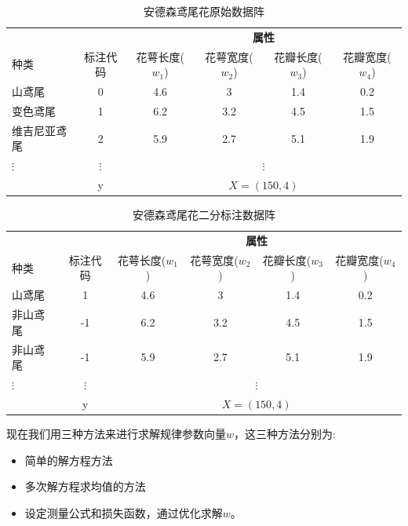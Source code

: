 \documentclass[12pt]{article}
\numberwithin{figure}{section}
\newenvironment{fullmodel}{
			\smallskip\noindent
			\begin{minipage}{\textwidth+\marginparwidth+\marginparsep}\smallskip\smallskip}
			{\smallskip\smallskip\end{minipage}\vspace{.1in}
			}
\numberwithin{equation}{section}
\begin{document}
\begin{fullmodel}
\begin{table}[H]
		\centering
		\renewcommand{\arraystretch}{1.2}
		\begin{tabular}{lccccc}
		\hline 
		\hline 
		& & \multicolumn{4}{c}{\textbf{属性}} \\
		\cline{3-6}
			种类 & 标注代码 & 花萼长度($w_1$) & 花萼宽度($w_2$) &花瓣长度($w_3$) & 花瓣宽度($w_4$) \\
			\hline 
			山鸢尾 & 0 & 4.6 &  3 &  1.4 & 0.2 \\
			变色鸢尾 & 1 & 6.2 &  3.2 & 4.5  & 1.5 \\
			维吉尼亚鸢尾 & 2 & 5.9 &  2.7 &  5.1 & 1.9  \\ 
			$\vdots$ & $\vdots$ & \multicolumn{4}{c}{$\vdots$} \\
			\hline 
			& y & \multicolumn{4}{c}{$X = (150, 4)$} \\
			\hline  
		\end{tabular}
		\caption{安德森鸢尾花原始数据阵}
\end{table}


\begin{table}[H]
		\centering
		\renewcommand{\arraystretch}{1.2}
		\begin{tabular}{lccccc}
		\hline 
		\hline 
		& & \multicolumn{4}{c}{\textbf{属性}} \\
		\cline{3-6}
			种类 & 标注代码 & 花萼长度($w_1$) & 花萼宽度($w_2$) &花瓣长度($w_3$) & 花瓣宽度($w_4$) \\
			\hline 
			山鸢尾 & 1 & 4.6 &  3 &  1.4 & 0.2 \\
			非山鸢尾 & -1 & 6.2 &  3.2 & 4.5  & 1.5 \\
			非山鸢尾 & -1 & 5.9 &  2.7 &  5.1 & 1.9  \\ 
			$\vdots$ & $\vdots$ & \multicolumn{4}{c}{$\vdots$} \\
			\hline 
			& y & \multicolumn{4}{c}{$X = (150, 4)$} \\
			\hline  
		\end{tabular}
		\caption{安德森鸢尾花二分标注数据阵}
\end{table}
\end{fullmodel}

现在我们用三种方法来进行求解规律参数向量$w$，这三种方法分别为:
\begin{itemize}
	\item 简单的解方程方法
	\item 多次解方程求均值的方法
	\item 设定测量公式和损失函数，通过优化求解$w$。
\end{itemize}
\end{document}
